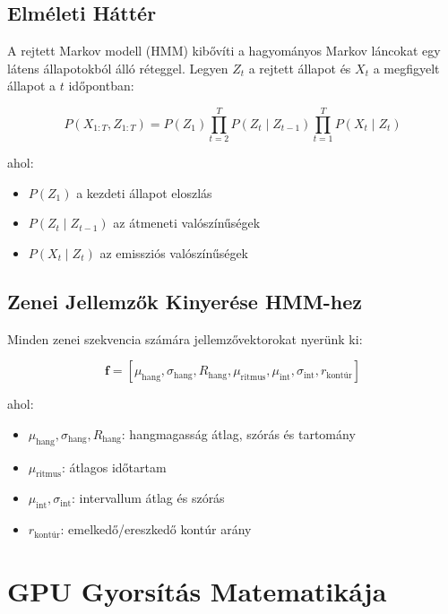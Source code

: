 \subsection{Elméleti Háttér}

A rejtett Markov modell (HMM) kibővíti a hagyományos Markov láncokat egy látens állapotokból álló réteggel. Legyen $Z_t$ a rejtett állapot és $X_t$ a megfigyelt állapot a $t$ időpontban:

\begin{equation}
P(X_{1:T}, Z_{1:T}) = P(Z_1) \prod_{t=2}^{T} P(Z_t \mid Z_{t-1}) \prod_{t=1}^{T} P(X_t \mid Z_t)
\end{equation}

ahol:
\begin{itemize}
\item $P(Z_1)$ a kezdeti állapot eloszlás
\item $P(Z_t \mid Z_{t-1})$ az átmeneti valószínűségek
\item $P(X_t \mid Z_t)$ az emissziós valószínűségek
\end{itemize}

\subsection{Zenei Jellemzők Kinyerése HMM-hez}

Minden zenei szekvencia számára jellemzővektorokat nyerünk ki:

\begin{equation}
\mathbf{f} = [\mu_{\text{hang}}, \sigma_{\text{hang}}, R_{\text{hang}}, \mu_{\text{ritmus}}, \mu_{\text{int}}, \sigma_{\text{int}}, r_{\text{kontúr}}]
\end{equation}

ahol:
\begin{itemize}
    \item $\mu_{\text{hang}}, \sigma_{\text{hang}}, R_{\text{hang}}$: hangmagasság átlag, szórás és tartomány
    \item $\mu_{\text{ritmus}}$: átlagos időtartam
    \item $\mu_{\text{int}}, \sigma_{\text{int}}$: intervallum átlag és szórás
    \item $r_{\text{kontúr}}$: emelkedő/ereszkedő kontúr arány
\end{itemize}

\section{GPU Gyorsítás Matematikája}

